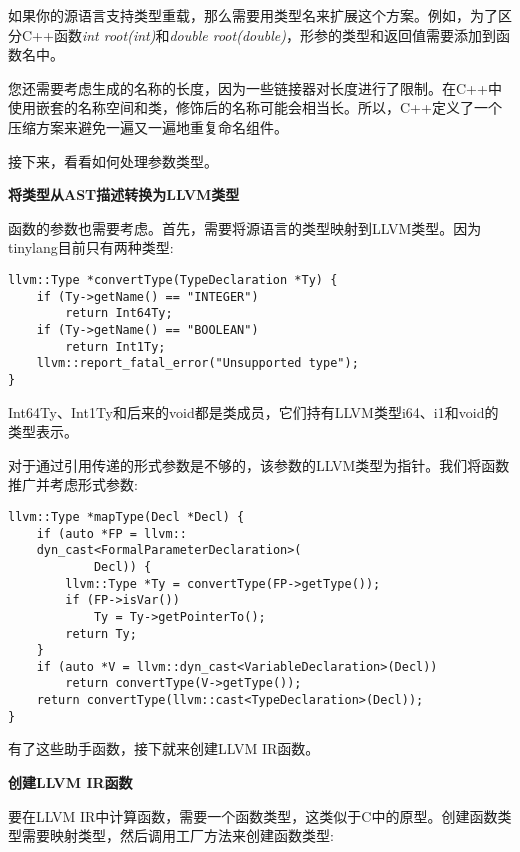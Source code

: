 如果你的源语言支持类型重载，那么需要用类型名来扩展这个方案。例如，为了区分C++函数\textit{int root(int)}和\textit{double root(double)}，形参的类型和返回值需要添加到函数名中。\par

您还需要考虑生成的名称的长度，因为一些链接器对长度进行了限制。在C++中使用嵌套的名称空间和类，修饰后的名称可能会相当长。所以，C++定义了一个压缩方案来避免一遍又一遍地重复命名组件。\par

接下来，看看如何处理参数类型。\par

\hspace*{\fill} \par %
\textbf{将类型从AST描述转换为LLVM类型}

函数的参数也需要考虑。首先，需要将源语言的类型映射到LLVM类型。因为tinylang目前只有两种类型:\par

\begin{lstlisting}[caption={}]
llvm::Type *convertType(TypeDeclaration *Ty) {
	if (Ty->getName() == "INTEGER")
		return Int64Ty;
	if (Ty->getName() == "BOOLEAN")
		return Int1Ty;
	llvm::report_fatal_error("Unsupported type");
}
\end{lstlisting}

Int64Ty、Int1Ty和后来的void都是类成员，它们持有LLVM类型i64、i1和void的类型表示。\par

对于通过引用传递的形式参数是不够的，该参数的LLVM类型为指针。我们将函数推广并考虑形式参数:\par

\begin{lstlisting}[caption={}]
llvm::Type *mapType(Decl *Decl) {
	if (auto *FP = llvm::
	dyn_cast<FormalParameterDeclaration>(
			Decl)) {
		llvm::Type *Ty = convertType(FP->getType());
		if (FP->isVar())
			Ty = Ty->getPointerTo();
		return Ty;
	}
	if (auto *V = llvm::dyn_cast<VariableDeclaration>(Decl))
		return convertType(V->getType());
	return convertType(llvm::cast<TypeDeclaration>(Decl));
}
\end{lstlisting}

有了这些助手函数，接下就来创建LLVM IR函数。\par

\hspace*{\fill} \par %
\textbf{创建LLVM IR函数}

要在LLVM IR中计算函数，需要一个函数类型，这类似于C中的原型。创建函数类型需要映射类型，然后调用工厂方法来创建函数类型:\par

